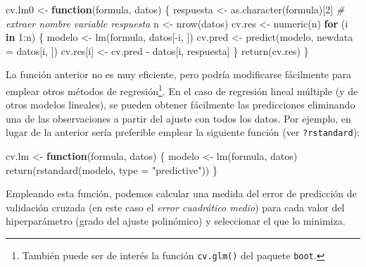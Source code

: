 \documentclass[
  spanish,
]{book}
\newenvironment{Shaded}{\begin{snugshade}}{\end{snugshade}}
\newcommand{\AttributeTok}[1]{\textcolor[rgb]{0.77,0.63,0.00}{#1}}
\newcommand{\CommentTok}[1]{\textcolor[rgb]{0.56,0.35,0.01}{\textit{#1}}}
\newcommand{\ControlFlowTok}[1]{\textcolor[rgb]{0.13,0.29,0.53}{\textbf{#1}}}
\newcommand{\DecValTok}[1]{\textcolor[rgb]{0.00,0.00,0.81}{#1}}
\newcommand{\FunctionTok}[1]{\textcolor[rgb]{0.00,0.00,0.00}{#1}}
\newcommand{\NormalTok}[1]{#1}
\newcommand{\OtherTok}[1]{\textcolor[rgb]{0.56,0.35,0.01}{#1}}
\newcommand{\SpecialCharTok}[1]{\textcolor[rgb]{0.00,0.00,0.00}{#1}}
\newcommand{\StringTok}[1]{\textcolor[rgb]{0.31,0.60,0.02}{#1}}
\theoremstyle{break}
\theoremstyle{definition}
\theoremstyle{definition}
\theoremstyle{definition}
\theoremstyle{definition}
\theoremstyle{remark}
\begin{document}
\begin{Shaded}
\begin{Highlighting}[]
\NormalTok{cv.lm0 }\OtherTok{\textless{}{-}} \ControlFlowTok{function}\NormalTok{(formula, datos) \{}
\NormalTok{    respuesta }\OtherTok{\textless{}{-}} \FunctionTok{as.character}\NormalTok{(formula)[}\DecValTok{2}\NormalTok{] }\CommentTok{\# extraer nombre variable respuesta}
\NormalTok{    n }\OtherTok{\textless{}{-}} \FunctionTok{nrow}\NormalTok{(datos)}
\NormalTok{    cv.res }\OtherTok{\textless{}{-}} \FunctionTok{numeric}\NormalTok{(n)}
    \ControlFlowTok{for}\NormalTok{ (i }\ControlFlowTok{in} \DecValTok{1}\SpecialCharTok{:}\NormalTok{n) \{}
\NormalTok{        modelo }\OtherTok{\textless{}{-}} \FunctionTok{lm}\NormalTok{(formula, datos[}\SpecialCharTok{{-}}\NormalTok{i, ])}
\NormalTok{        cv.pred }\OtherTok{\textless{}{-}} \FunctionTok{predict}\NormalTok{(modelo, }\AttributeTok{newdata =}\NormalTok{ datos[i, ])}
\NormalTok{        cv.res[i] }\OtherTok{\textless{}{-}}\NormalTok{ cv.pred }\SpecialCharTok{{-}}\NormalTok{ datos[i, respuesta]}
\NormalTok{    \}}
    \FunctionTok{return}\NormalTok{(cv.res)}
\NormalTok{\}}
\end{Highlighting}
\end{Shaded}

La función anterior no es muy eficiente, pero podría modificarse fácilmente para emplear otros métodos de regresión\footnote{También puede ser de interés la función \texttt{cv.glm()} del paquete \texttt{boot}.}.
En el caso de regresión lineal múltiple (y de otros modelos lineales), se pueden obtener fácilmente las predicciones eliminando una de las observaciones a partir del ajuste con todos los datos.
Por ejemplo, en lugar de la anterior sería preferible emplear la siguiente función (ver \texttt{?rstandard}):

\begin{Shaded}
\begin{Highlighting}[]
\NormalTok{cv.lm }\OtherTok{\textless{}{-}} \ControlFlowTok{function}\NormalTok{(formula, datos) \{}
\NormalTok{    modelo }\OtherTok{\textless{}{-}} \FunctionTok{lm}\NormalTok{(formula, datos)}
    \FunctionTok{return}\NormalTok{(}\FunctionTok{rstandard}\NormalTok{(modelo, }\AttributeTok{type =} \StringTok{"predictive"}\NormalTok{))}
\NormalTok{\}}
\end{Highlighting}
\end{Shaded}

Empleando esta función, podemos calcular una medida del error de predicción de validación cruzada (en este caso el \emph{error cuadrático medio}) para cada valor del hiperparámetro (grado del ajuste polinómico) y seleccionar el que lo minimiza.
\end{document}
